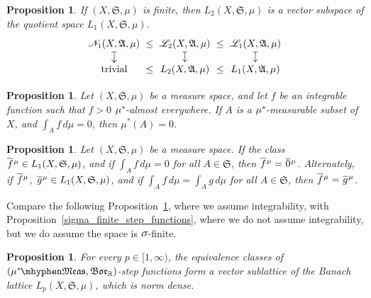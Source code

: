 \documentclass[
twoside=true,
paper=letter,
fontsize=9pt,
pagesize=auto,
leqno,
openany,
headsepline,
overfullrule,
]{scrbook}
\theoremstyle{plain}
\theoremstyle{plain}
\newtheorem{prop}[thm]{Proposition}
\theoremstyle{definition}
\theoremstyle{bfnoteitalic}
\theoremstyle{bfnoteroman}
\newcommand{\sigalg}[1]{\mathfrak{#1}}
\newcommand{\cali}[1]{\mathscr{#1}}
\newcommand{\borel}{\mathfrak{Bor}}
\newcommand{\textsigma}{\hbox{\large{$\sigma$}}\kern-1pt}
\newcommand{\R}{\mathbb{R}}
\newcommand{\semiring}{\sigalg{S}}
\newcommand{\sigmaalgebra}{\sigalg{A}}
\newcommand{\measurable}[1]{{#1}\mhyphen\mathfrak{Meas}}
\newcommand{\kernast}{\ast\kern-1pt}
\newcommand{\measurespace}{X}
\newcommand{\measure}{\mu}
\newcommand*\xbar[1]{%
   \hbox{%
     \vbox{%
       \hrule height 0.4pt %
       \kern0.4ex%
       \hbox{%
         \ensuremath{#1}%
       }%
     }%
   }%
}
\newcommand{\lebclass}[1]{\hspace{.5pt}\xbar{#1}\hspace{0.5pt}}
\newcommand{\ellclass}[2]{\lebclass{#1}^{#2}}
\begin{document}
\begin{prop}
If $(\measurespace, \semiring, \measure)$ is finite, then $L_2(\measurespace, \semiring, \measure)$ is a vector subspace of the quotient space
$L_1(\measurespace, \semiring, \measure)$. 
\[
\xymatrix@R=10pt@C=0pt{ 
\cali{N}_1(\measurespace, \sigmaalgebra, \measure) \ar@{|->}[d] & \leq  & 
\cali{L}_2(\measurespace, \sigmaalgebra, \measure) \ar@{|->}[d] & \leq & 
\cali{L}_1(\measurespace, \sigmaalgebra, \measure) \ar@{|->}[d]\\
\text{trivial} & \leq & 
L_2(\measurespace, \sigmaalgebra, \measure) & \leq &
L_1(\measurespace, \sigmaalgebra, \measure)\\
}
\]
\end{prop}






\begin{prop}\label{null_set_test}
Let $(\measurespace, \semiring, \measure)$ be a measure space, and let $f$ be an integrable function such that $f>0$ $\measure^\kernast$-almost everywhere.  If 
$A$ is a $\measure^\kernast$-measurable subset of $\measurespace$, and $\int_A f\, d\measure=0$, then $\measure^*(A)=0$.
\end{prop}



\begin{prop}\label{equal_function_test}
Let $(\measurespace, \semiring, \measure)$ be a measure space. If the class
$\ellclass{f}{\measure}\in L_1 (\measurespace, \semiring, \measure)$, and if  $\int_A f\, d\measure =0$ for all $A\in \semiring$, then $\ellclass{f}{\measure} = \ellclass{0}{\measure}$. Alternately,  if
$\ellclass{f}{\measure}$, $\ellclass{g}{\measure} \in L_1 (\measurespace, \semiring, \measure)$, and if 
$\int_A f\, d\measure = \int_A g\, d\measure$ for all $A\in \semiring$, then 
$\ellclass{f}{\measure} = \ellclass{g}{\measure}$.
\end{prop}



Compare the following Proposition~\ref{step_functions_dense}, where we assume integrability, with Proposition~\ref{sigma_finite_step_functions}, where we do not assume integrability, but we do assume
the space is $\textsigma$-finite.



\begin{prop}\label{step_functions_dense}
For every $p\in [1, \infty)$, the equivalence classes of $(\measurable{\measure^\kernast}, \borel_\R)$-step functions form a vector sublattice of the Banach lattice $L_p(\measurespace, \semiring, \measure)$, which is norm dense.
\end{prop}
\end{document}
